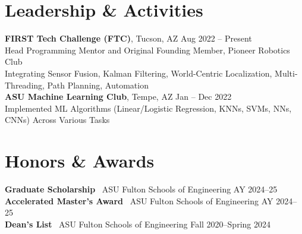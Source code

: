 \documentclass[10pt]{article}
\begin{document}
\section*{Leadership \& Activities}
\textbf{FIRST Tech Challenge (FTC)}, Tucson, AZ \hfill Aug 2022 -- Present \\
Head Programming Mentor and Original Founding Member, Pioneer Robotics Club\\
\hspace*{2em}Integrating Sensor Fusion, Kalman Filtering, World-Centric Localization, Multi-Threading, Path Planning, Automation
\\
\textbf{ASU Machine Learning Club}, Tempe, AZ \hfill Jan -- Dec 2022 \\
\hspace*{2em}Implemented ML Algorithms (Linear/Logistic Regression, KNNs, SVMs, NNs, CNNs) Across Various Tasks

\section*{Honors \& Awards}
\textbf{Graduate Scholarship} \textbar\ ASU Fulton Schools of Engineering \hfill AY 2024--25 \\
\textbf{Accelerated Master's Award} \textbar\ ASU Fulton Schools of Engineering \hfill AY 2024--25\\
\textbf{Dean's List} \textbar\ ASU Fulton Schools of Engineering \hfill Fall 2020--Spring 2024
\end{document}
